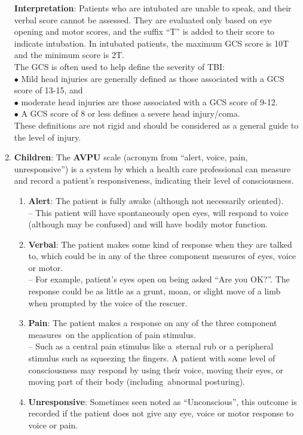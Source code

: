 \documentclass[11pt,a4paper]{report}
\begin{document}
\begin{enumerate}
\begin{enumerate}
\begin{itemize}
		\end{itemize}
	\end{enumerate}
	\textbf{Interpretation}: Patients who are intubated are unable to speak, and their verbal score cannot be assessed. They are evaluated only based on eye opening and motor scores, and the suffix ``T'' is added to their score to indicate intubation. In intubated patients, the maximum GCS score is 10T and the minimum score is 2T. \\
	The GCS is often used to help define the severity of TBI: \\
	$\bullet$ Mild head injuries are generally defined as those associated with a GCS score of 13-15, and \\
	$\bullet$ moderate head injuries are those associated with a GCS score of 9-12. \\
	$\bullet$ A GCS score of 8 or less defines a severe head injury/coma. \\
	These definitions are not rigid and should be considered as a general guide to the level of injury. \cite{jennett1975} 
	
	\newpage
	\item \textbf{Children}:
	The {\color{teal}\textbf{AVPU}} scale (acronym from ``alert, voice, pain, unresponsive'') is a system by which a health care professional can measure and record a patient's responsiveness, indicating their level of consciousness. 
	\begin{enumerate}
		\item \textbf{Alert}: The patient is fully awake (although not necessarily oriented). \\
		-- This patient will have spontaneously open eyes, will respond to voice (although may be confused) and will have bodily motor function.
		\item \textbf{Verbal}: The patient makes some kind of response when they are talked to, which could be in any of the three component measures of eyes, voice or motor. \\
		-- For example, patient's eyes open on being asked ``Are you OK?''. The response could be as little as a grunt, moan, or slight move of a limb when prompted by the voice of the rescuer.
		\item \textbf{Pain}: The patient makes a response on any of the three component measures on the application of pain stimulus. \\
		-- Such as a central pain stimulus like a sternal rub or a peripheral stimulus such as squeezing the fingers. A patient with some level of consciousness may respond by using their voice, moving their eyes, or moving part of their body (including abnormal posturing).
		\item \textbf{Unresponsive}: Sometimes seen noted as ``Unconscious'', this outcome is recorded if the patient does not give any eye, voice or motor response to voice or pain. \cite{hoffmann2016}
	\end{enumerate} 
\end{enumerate}
\end{document}
